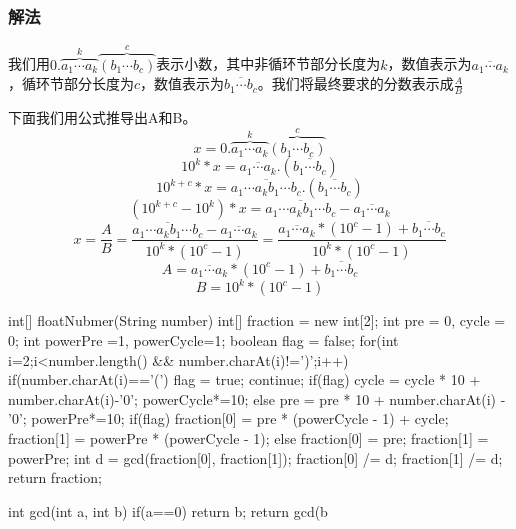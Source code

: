\subsubsection{解法}

我们用$0.\overbrace{a_1 \cdots a_k}^{k} \overbrace{(b_1 \cdots b_c)}^{c}$表示小数，其中非循环节部分长度为$k$，数值表示为$\overline{a_1 \cdots a_k}$，循环节部分长度为$c$，数值表示为$\overline{b_1 \cdots b_c}$。我们将最终要求的分数表示成$\frac{A}{B}$

下面我们用公式推导出A和B。
\[ x = 0.\overbrace{a_1 \cdots a_k}^{k} \overbrace{(b_1 \cdots b_c)}^{c}  \]
\[ 10^k*x = \overline{a_1 \cdots a_k}.(\overline{b_1 \cdots b_c}) \]
\[ 10^{k+c}*x = \overline{a_1 \cdots a_kb_1 \cdots b_c}.(\overline{b_1 \cdots b_c}) \]
\[ (10^{k+c}-10^{k}) * x = \overline{a_1 \cdots a_kb_1 \cdots b_c}-\overline{a_1 \cdots a_k} \]
\[ x = \frac{A}{B} = \frac{\overline{a_1 \cdots a_kb_1 \cdots b_c}-\overline{a_1 \cdots a_k}}{10^k*(10^c-1)} = \frac{\overline{a_1 \cdots a_k}*(10^c-1) + \overline{b_1 \cdots b_c}}{10^k*(10^c-1)} \]
\[ A = \overline{a_1 \cdots a_k}*(10^c-1) + \overline{b_1 \cdots b_c} \]
\[ B = 10^k*(10^c-1) \]
\begin{Codex}[label={[$O(N)+O(1)$]Chap02_06_FloatNumber.java}]
	int[] floatNubmer(String number) {
		int[] fraction = new int[2];
		int pre = 0, cycle = 0;
		int powerPre =1, powerCycle=1;
		boolean flag = false;
		for(int i=2;i<number.length() && number.charAt(i)!=')';i++) {
			if(number.charAt(i)=='(') {
				flag = true;
				continue;
			}
			if(flag) {
				cycle = cycle * 10 + number.charAt(i)-'0';
				powerCycle*=10;
			} else {
			pre = pre * 10 + number.charAt(i) - '0';
			powerPre*=10;
		}
	}
	if(flag) {
		fraction[0] = pre * (powerCycle - 1) + cycle;
		fraction[1] = powerPre * (powerCycle - 1);
	} else {
	fraction[0] = pre;
	fraction[1] = powerPre;
}
int d = gcd(fraction[0], fraction[1]);
fraction[0] /= d;
fraction[1] /= d;
return fraction;
}

int gcd(int a, int b) {
	if(a==0) return b;
	return gcd(b%
}
\end{Codex}

